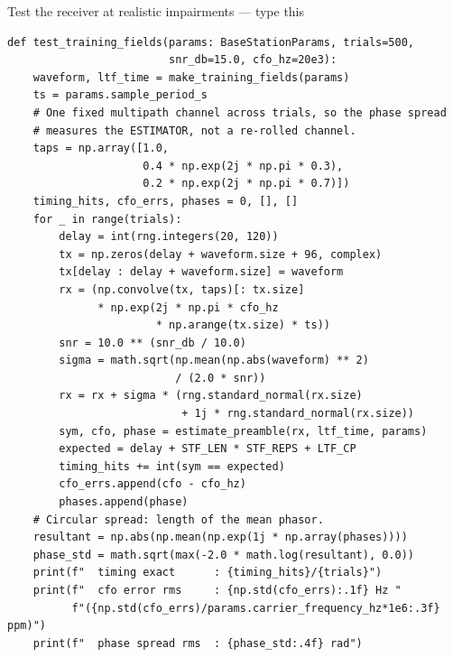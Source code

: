 \documentclass[10pt]{beamer}
\begin{document}
\begin{frame}[fragile]{Test the receiver at realistic impairments --- type this}
\begin{lstlisting}[basicstyle=\ttfamily\tiny]
def test_training_fields(params: BaseStationParams, trials=500,
                         snr_db=15.0, cfo_hz=20e3):
    waveform, ltf_time = make_training_fields(params)
    ts = params.sample_period_s
    # One fixed multipath channel across trials, so the phase spread
    # measures the ESTIMATOR, not a re-rolled channel.
    taps = np.array([1.0,
                     0.4 * np.exp(2j * np.pi * 0.3),
                     0.2 * np.exp(2j * np.pi * 0.7)])
    timing_hits, cfo_errs, phases = 0, [], []
    for _ in range(trials):
        delay = int(rng.integers(20, 120))
        tx = np.zeros(delay + waveform.size + 96, complex)
        tx[delay : delay + waveform.size] = waveform
        rx = (np.convolve(tx, taps)[: tx.size]
              * np.exp(2j * np.pi * cfo_hz
                       * np.arange(tx.size) * ts))
        snr = 10.0 ** (snr_db / 10.0)
        sigma = math.sqrt(np.mean(np.abs(waveform) ** 2)
                          / (2.0 * snr))
        rx = rx + sigma * (rng.standard_normal(rx.size)
                           + 1j * rng.standard_normal(rx.size))
        sym, cfo, phase = estimate_preamble(rx, ltf_time, params)
        expected = delay + STF_LEN * STF_REPS + LTF_CP
        timing_hits += int(sym == expected)
        cfo_errs.append(cfo - cfo_hz)
        phases.append(phase)
    # Circular spread: length of the mean phasor.
    resultant = np.abs(np.mean(np.exp(1j * np.array(phases))))
    phase_std = math.sqrt(max(-2.0 * math.log(resultant), 0.0))
    print(f"  timing exact      : {timing_hits}/{trials}")
    print(f"  cfo error rms     : {np.std(cfo_errs):.1f} Hz "
          f"({np.std(cfo_errs)/params.carrier_frequency_hz*1e6:.3f} ppm)")
    print(f"  phase spread rms  : {phase_std:.4f} rad")
\end{lstlisting}
\end{frame}
\end{document}
